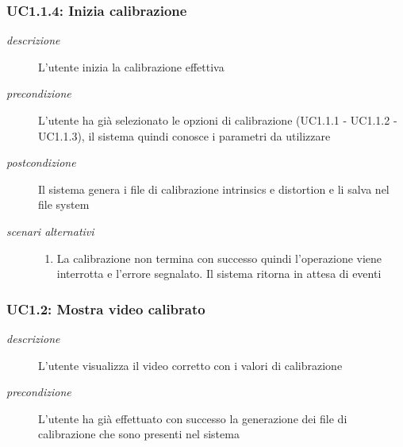 \subsubsection{UC1.1.4: Inizia calibrazione} \label{sec:UC1.1.4}
\begin{description}
\item[\em{descrizione }]L'utente inizia la calibrazione effettiva
\item[\em{precondizione }] L'utente ha già selezionato le opzioni di calibrazione (UC1.1.1 - UC1.1.2 - UC1.1.3), il sistema quindi conosce i parametri da utilizzare
\item[\em{postcondizione }] Il sistema genera i file di calibrazione intrinsics e distortion e li salva nel file system
\item[\em{scenari alternativi }] \mbox{}

  \begin{enumerate}
\item La calibrazione non termina con successo quindi l'operazione viene interrotta e l'errore segnalato. Il sistema ritorna in attesa di eventi
\end{enumerate}
\end{description}

\subsubsection{UC1.2: Mostra video calibrato} \label{sec:UC1.2}
\begin{description}
\item[\em{descrizione }]L'utente visualizza il video corretto con i valori di calibrazione
\item[\em{precondizione }] L'utente ha già effettuato con successo la generazione dei file di calibrazione che sono presenti nel sistema
\end{description}

